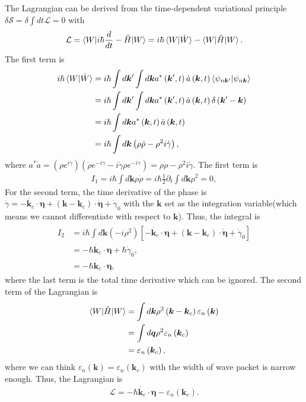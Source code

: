 \documentclass[12pt, oneside]{article}
\newcommand{\pr}{\prime}
\newcommand{\pa}{\partial}
\newcommand{\p}[1]{\left(#1\right)}
\newcommand{\bb}[1]{\left[#1\right]}
\numberwithin{equation}{subsection}
\begin{document}
The Lagrangian can be derived from the time-dependent variational principle \(\delta \mathcal{S} =  \delta \int dt \mathcal{L} = 0\) with 
\begin{align}
	\mathcal{L} = \braket{W| i \hbar \frac{d}{dt} - \hat{H} | W} = i \hbar \braket{W|\dot{W}} - \braket{W|\hat{H}|W}.
\end{align}
The first term is 
\begin{align}
	\begin{split}
		i \hbar \braket{W|\dot{W}}  & = i \hbar \int d \bm{k}^\pr \int d \bm{k} a^{*} \p{\bm{k}^\pr, t} \dot{a} \p{\bm{k}, t} \braket{\psi_{n \bm{k}^\pr} | \psi_{n \bm{k}}} \\
		& = i \hbar \int d \bm{k}^\pr \int d \bm{k} a^{*} \p{\bm{k}^\pr, t} \dot{a} \p{\bm{k}, t} \delta \p{\bm{k}^\pr - \bm{k}} \\
		& = i \hbar \int d \bm{k} a^{*}\p{\bm{k}, t} \dot{a} \p{\bm{k}, t} \\
		& = i \hbar \int d \bm{k} \p{\rho \dot{\rho} - \rho^2 i \dot{\gamma}},
	\end{split}
\end{align}
where \(a^* \dot{a} = \p{\rho e^{i \gamma}} \p{\dot{\rho}  e^{-i \gamma} - i \dot{\gamma} \rho e^{-i \gamma}} = \rho \dot{\rho} - \rho^2 i \dot{\gamma}\). The first term is 
\begin{align}
	I_1  = i \hbar \int d \bm{k} \rho \dot{\rho}  = i \hbar \frac12 \pa_{t} \int d \bm{k} \rho^2 = 0,
\end{align}
For the second term, the time derivative of the phase is \(\dot{\gamma} = - \dot{\bm{k}_c} \cdot \bm{\eta} + \p{\bm{k} - \bm{k}_c} \cdot \dot{\bm{\eta}} + \dot{\gamma}_0\) with the \(\bm{k}\) set as the integration variable(which means we cannot differentiate with respect to \(\bm{k}\)). Thus, the integral is 
\begin{align}
	\begin{split}
		I_2 & = i \hbar \int d \bm{k} \p{-i \rho^2} \bb{- \dot{\bm{k}_c} \cdot \bm{\eta} + \p{\bm{k} - \bm{k}_c} \cdot \dot{\bm{\eta}} + \dot{\gamma}_0} \\
		& = - \hbar \dot{\bm{k}_c} \cdot \bm{\eta} + \hbar \dot{\gamma}_0,\\
		& = - \hbar \dot{\bm{k}_c} \cdot \bm{\eta},
	\end{split}
\end{align}
where the last term is the total time derivative which can be ignored. The second term of the Lagrangian is
\begin{align}
	\begin{split}
		\braket{W | \hat{H} | W} &  = \int d \bm{k} \rho^2 \p{\bm{k} - \bm{k}_c} \varepsilon_n \p{\bm{k}} \\
		& = \int d \bm{q} \rho^2 \varepsilon_{n} \p{\bm{k}_c} \\
		& = \varepsilon_n \p{\bm{k}_c},
	\end{split}
\end{align}
where we can think \(\varepsilon_{n} \p{\bm{k}} = \varepsilon_{n} \p{\bm{k}_c}\) with the width of wave packet is narrow enough. Thus, the Lagrangian is
\begin{align}
	\mathcal{L} = - \hbar \dot{\bm{k}_c} \cdot \bm{\eta} - \varepsilon_n \p{\bm{k}_c}.
\end{align}
\end{document}
